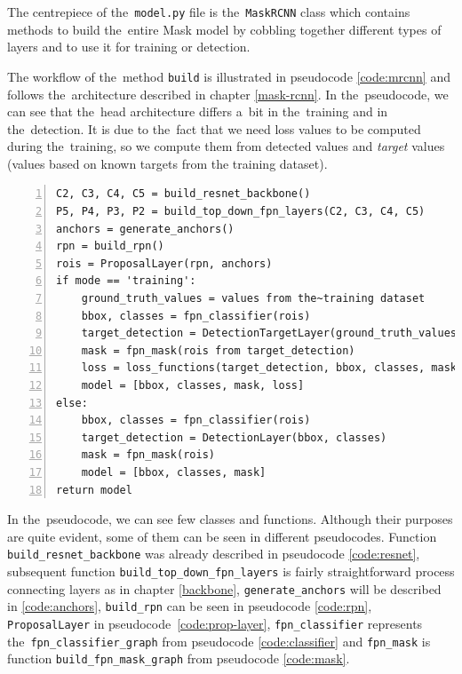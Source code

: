 The centrepiece of the~\verb|model.py| file is the~\verb|MaskRCNN| class which 
contains methods to build the~entire Mask  model by cobbling together 
different types of layers and to use it for training or detection.

The workflow of the~method \verb|build| is illustrated in pseudocode 
\ref{code:mrcnn} and follows the~architecture described in chapter 
\ref{mask-rcnn}. In the~pseudocode, we can see that the~head architecture 
differs a~bit in the~training and in the~detection. It is due to the~fact that 
we need loss values to be computed during the~training, so we compute them from 
detected values and \textit{target} values (values based on known targets from 
the training dataset).

{\scriptsize
\begin{lstlisting}[style=python, caption={Mask R-CNN.build}, captionpos=b, 
label=code:mrcnn, deletekeywords={from},
backgroundcolor = \color{light-gray}, numbers=left, breaklines=true]
C2, C3, C4, C5 = build_resnet_backbone()
P5, P4, P3, P2 = build_top_down_fpn_layers(C2, C3, C4, C5)
anchors = generate_anchors()
rpn = build_rpn()
rois = ProposalLayer(rpn, anchors)
if mode == 'training':
    ground_truth_values = values from the~training dataset
    bbox, classes = fpn_classifier(rois)
    target_detection = DetectionTargetLayer(ground_truth_values)
    mask = fpn_mask(rois from target_detection)
    loss = loss_functions(target_detection, bbox, classes, mask)
    model = [bbox, classes, mask, loss]
else:
    bbox, classes = fpn_classifier(rois)
    target_detection = DetectionLayer(bbox, classes)
    mask = fpn_mask(rois)
    model = [bbox, classes, mask]
return model
\end{lstlisting}}

In the~pseudocode, we can see few classes and functions. Although their purposes are quite 
evident, some of them can be seen in different pseudocodes. Function
\verb|build_resnet_backbone| was already described in pseudocode \ref{code:resnet}, subsequent
func\-tion \verb|build_top_down_fpn_layers| is fairly straightforward process connecting 
layers as in chapter \ref{backbone}, \verb|generate_anchors| will be described 
in \ref{code:anchors}, \verb|build_rpn| can be seen in pseudocode 
\ref{code:rpn}, \verb|ProposalLayer| in pseudocode~\ref{code:prop-layer}, 
\verb|fpn_classifier| represents the~\verb|fpn_classifier_graph| from pseudocode 
\ref{code:classifier} and \verb|fpn_mask| is function \verb|build_fpn_mask_graph| from 
pseudocode \ref{code:mask}.

